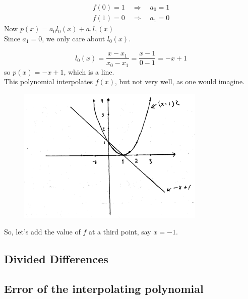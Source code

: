 \begin{equation*}
    \begin{split}
        f(0)=1 \quad \Rightarrow \quad a_0 = 1 \\
        f(1)=0 \quad \Rightarrow \quad a_1 = 0
    \end{split}
\end{equation*}
Now $p(x) = a_0 l_0 (x) + a_1 l_1 (x)$ \\

Since $a_1 = 0$, we only care about $l_0(x)$.

\begin{equation*}
    l_0 (x) = \frac{x-x_1}{x_0-x_1} = \frac{x-1}{0-1} = -x + 1
\end{equation*}
so $p(x) = -x + 1$, which is a line. \\

This polynomial interpolates $f(x)$, but not very well, as one would imagine.

\begin{figure}[H]
    \centering
    \includegraphics[width=0.8\textwidth]{figures/chap_03/polynomial-1.png}
    \label{fig:polynomial-1}
\end{figure}
So, let's add the value of $f$ at a third point, say $x=-1$. 

\subsection{Divided Differences}

\subsection{Error of the interpolating polynomial}
